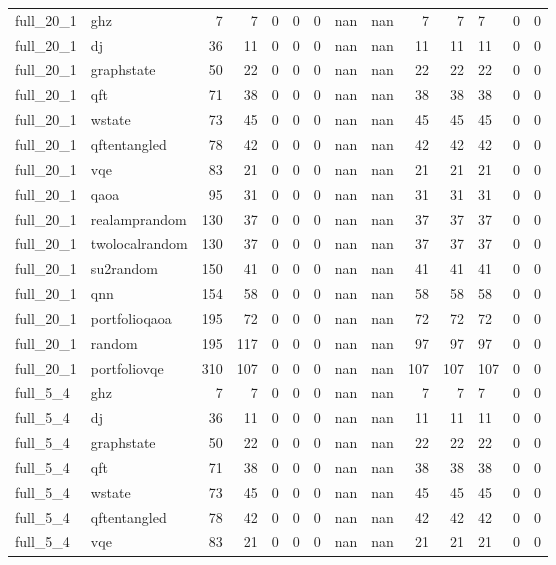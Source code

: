 \begin{longtable}{llrrrrlllrrlll}
full\_20\_1 & ghz & 7 & 7 & 0 & 0 & 0 & nan & nan & 7 & 7 & 7 & 0 & 0 \\
full\_20\_1 & dj & 36 & 11 & 0 & 0 & 0 & nan & nan & 11 & 11 & 11 & 0 & 0 \\
full\_20\_1 & graphstate & 50 & 22 & 0 & 0 & 0 & nan & nan & 22 & 22 & 22 & 0 & 0 \\
full\_20\_1 & qft & 71 & 38 & 0 & 0 & 0 & nan & nan & 38 & 38 & 38 & 0 & 0 \\
full\_20\_1 & wstate & 73 & 45 & 0 & 0 & 0 & nan & nan & 45 & 45 & 45 & 0 & 0 \\
full\_20\_1 & qftentangled & 78 & 42 & 0 & 0 & 0 & nan & nan & 42 & 42 & 42 & 0 & 0 \\
full\_20\_1 & vqe & 83 & 21 & 0 & 0 & 0 & nan & nan & 21 & 21 & 21 & 0 & 0 \\
full\_20\_1 & qaoa & 95 & 31 & 0 & 0 & 0 & nan & nan & 31 & 31 & 31 & 0 & 0 \\
full\_20\_1 & realamprandom & 130 & 37 & 0 & 0 & 0 & nan & nan & 37 & 37 & 37 & 0 & 0 \\
full\_20\_1 & twolocalrandom & 130 & 37 & 0 & 0 & 0 & nan & nan & 37 & 37 & 37 & 0 & 0 \\
full\_20\_1 & su2random & 150 & 41 & 0 & 0 & 0 & nan & nan & 41 & 41 & 41 & 0 & 0 \\
full\_20\_1 & qnn & 154 & 58 & 0 & 0 & 0 & nan & nan & 58 & 58 & 58 & 0 & 0 \\
full\_20\_1 & portfolioqaoa & 195 & 72 & 0 & 0 & 0 & nan & nan & 72 & 72 & 72 & 0 & 0 \\
full\_20\_1 & random & 195 & 117 & 0 & 0 & 0 & nan & nan & 97 & 97 & 97 & 0 & 0 \\
full\_20\_1 & portfoliovqe & 310 & 107 & 0 & 0 & 0 & nan & nan & 107 & 107 & 107 & 0 & 0 \\
full\_5\_4 & ghz & 7 & 7 & 0 & 0 & 0 & nan & nan & 7 & 7 & 7 & 0 & 0 \\
full\_5\_4 & dj & 36 & 11 & 0 & 0 & 0 & nan & nan & 11 & 11 & 11 & 0 & 0 \\
full\_5\_4 & graphstate & 50 & 22 & 0 & 0 & 0 & nan & nan & 22 & 22 & 22 & 0 & 0 \\
full\_5\_4 & qft & 71 & 38 & 0 & 0 & 0 & nan & nan & 38 & 38 & 38 & 0 & 0 \\
full\_5\_4 & wstate & 73 & 45 & 0 & 0 & 0 & nan & nan & 45 & 45 & 45 & 0 & 0 \\
full\_5\_4 & qftentangled & 78 & 42 & 0 & 0 & 0 & nan & nan & 42 & 42 & 42 & 0 & 0 \\
full\_5\_4 & vqe & 83 & 21 & 0 & 0 & 0 & nan & nan & 21 & 21 & 21 & 0 & 0 \\

\end{longtable}

